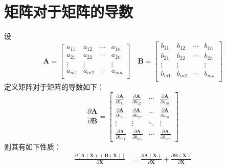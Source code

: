 \documentclass[UTF8,space=auto]{ctexart} %
\begin{document}
\section{矩阵对于矩阵的导数}
设
\[
\mathbf{A} =
\begin{bmatrix}
	a_{11} & a_{12} & \cdots & a_{1n} \\
	a_{21} & a_{22} & \cdots & a_{2n} \\
	\vdots & \vdots & & \vdots \\
	a_{m1} & a_{m2} & \cdots & a_{mn} \\
\end{bmatrix}\quad
\mathbf{B} =
\begin{bmatrix}
	b_{11} & b_{12} & \cdots & b_{1n} \\
	b_{21} & b_{22} & \cdots & b_{2n} \\
	\vdots & \vdots & & \vdots \\
	b_{m1} & b_{m2} & \cdots & b_{mn} \\
\end{bmatrix}
\]
定义矩阵对于矩阵的导数如下：
\[
\frac{\partial\mathbf{A}}{\partial\mathbf{B}} =
\begin{bmatrix}
	\frac{\partial \mathbf{A}}{\partial b_{11}} & \frac{\partial \mathbf{A}}{\partial b_{12}} & \cdots & \frac{\partial \mathbf{A}}{\partial b_{1n}} \\
	\frac{\partial \mathbf{A}}{\partial b_{21}} & \frac{\partial \mathbf{A}}{\partial b_{22}} & \cdots & \frac{\partial \mathbf{A}}{\partial b_{2n}} \\
	\vdots & \vdots & \ddots & \vdots \\
	\frac{\partial \mathbf{A}}{\partial b_{m1}} & \frac{\partial \mathbf{A}}{\partial b_{m2}} & \cdots & \frac{\partial \mathbf{A}}{\partial b_{mn}}
\end{bmatrix}
\]
则其有如下性质：
\begin{align}
\frac{\partial \left[ \mathbf{A}(\mathbf{X})+\mathbf{B}(\mathbf{X}) \right] }{\partial \mathbf{X}}&=\frac{\partial \mathbf{A}(\mathbf{X})}{\partial \mathbf{X}}+\frac{\partial \mathbf{B}(\mathbf{X})}{\partial \mathbf{X}}
\end{align}
\end{document}
